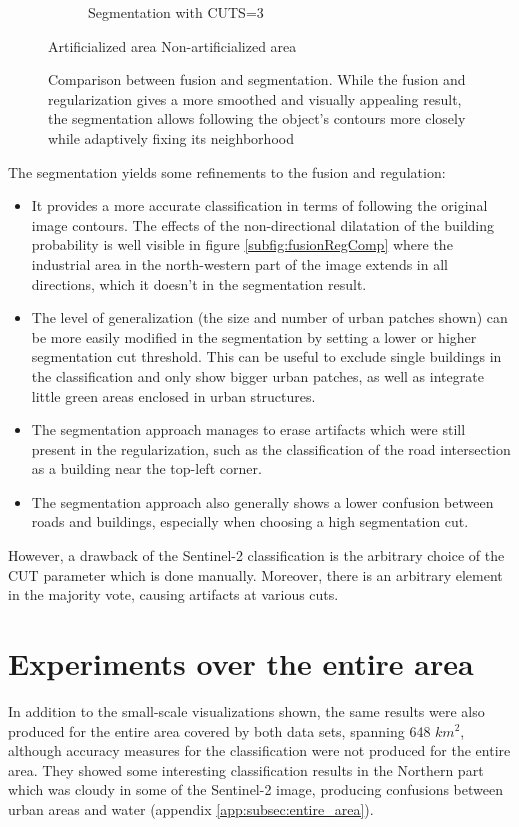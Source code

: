 \documentclass[10pt]{article}
\newcommand{\legendebin}{\vspace{3mm}
    
    \small\centering
    \fcolorbox{black}{red}{\rule{0pt}{6pt}\rule{6pt}{0pt}}\quad Artificialized area 
    \fcolorbox{black}{green}{\rule{0pt}{6pt}\rule{6pt}{0pt}}\quad Non-artificialized area
    }
\begin{document}
\begin{figure}[H]
\begin{subfigure}{0.49\textwidth}
        \caption{Segmentation with CUTS=3}
    \end{subfigure}
    \legendebin
    \caption{Comparison between fusion and segmentation. While the fusion and regularization gives a more smoothed and visually appealing result, the segmentation allows following the object's contours more closely while adaptively fixing its neighborhood} %
    \label{fig:comparison}
\end{figure}
The segmentation yields some refinements to the fusion and regulation:
\begin{itemize}
    \item It provides a more accurate classification in terms of following the original image contours. The effects of the non-directional dilatation of the building probability is well visible in figure \ref{subfig:fusionRegComp} where the industrial area in the north-western part of the image extends in all directions, which it doesn't in the segmentation result.
    \item The level of generalization (the size and number of urban patches shown) can be more easily modified in the segmentation by setting a lower or higher segmentation cut threshold. This can be useful to exclude single buildings in the classification and only show bigger urban patches, as well as integrate little green areas enclosed in urban structures. 
    \item The segmentation approach manages to erase artifacts which were still present in the regularization, such as the classification of the road intersection as a building near the top-left corner.
    \item The segmentation approach also generally shows a lower confusion between roads and buildings, especially when choosing a high segmentation cut.
\end{itemize}
However, a drawback of the Sentinel-2 classification is the arbitrary choice of the CUT parameter which is done manually. Moreover, there is an arbitrary element in the majority vote, causing artifacts at various cuts.


\section{Experiments over the entire area}
In addition to the small-scale visualizations shown, the same results were also produced for the entire area covered by both data sets, spanning 648 $km^2$, although accuracy measures for the classification were not produced for the entire area. They showed some interesting classification results in the Northern part which was cloudy in some of the Sentinel-2 image, producing confusions between urban areas and water (appendix \ref{app:subsec:entire_area}).
\end{document}
